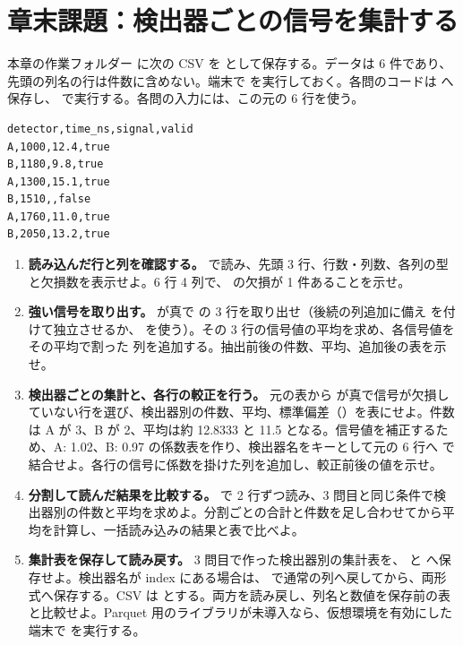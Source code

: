 \section{章末課題：検出器ごとの信号を集計する}

本章の作業フォルダー  に次の CSV を  として保存する。データは 6 件であり、先頭の列名の行は件数に含めない。端末で  を実行しておく。各問のコードは  へ保存し、 で実行する。各問の入力には、この元の 6 行を使う。

\begin{lstlisting}[numbers=none, xleftmargin=2\zw, title={events.csv}]
detector,time_ns,signal,valid
A,1000,12.4,true
B,1180,9.8,true
A,1300,15.1,true
B,1510,,false
A,1760,11.0,true
B,2050,13.2,true
\end{lstlisting}

\begin{enumerate}
\item \textbf{読み込んだ行と列を確認する。}
 で読み、先頭 3 行、行数・列数、各列の型と欠損数を表示せよ。6 行 4 列で、 の欠損が 1 件あることを示せ。

\item \textbf{強い信号を取り出す。}
 が真で  の 3 行を取り出せ（後続の列追加に備え  を付けて独立させるか、 を使う）。その 3 行の信号値の平均を求め、各信号値をその平均で割った  列を追加する。抽出前後の件数、平均、追加後の表を示せ。

\item \textbf{検出器ごとの集計と、各行の較正を行う。}
元の表から  が真で信号が欠損していない行を選び、検出器別の件数、平均、標準偏差（）を表にせよ。件数は A が 3、B が 2、平均は約 12.8333 と 11.5 となる。信号値を補正するため、A: 1.02、B: 0.97 の係数表を作り、検出器名をキーとして元の 6 行へ  で結合せよ。各行の信号に係数を掛けた列を追加し、較正前後の値を示せ。

\item \textbf{分割して読んだ結果を比較する。}
 で 2 行ずつ読み、3 問目と同じ条件で検出器別の件数と平均を求めよ。分割ごとの合計と件数を足し合わせてから平均を計算し、一括読み込みの結果と表で比べよ。

\item \textbf{集計表を保存して読み戻す。}
3 問目で作った検出器別の集計表を、 と  へ保存せよ。検出器名が index にある場合は、 で通常の列へ戻してから、両形式へ保存する。CSV は  とする。両方を読み戻し、列名と数値を保存前の表と比較せよ。Parquet 用のライブラリが未導入なら、仮想環境を有効にした端末で  を実行する。

\end{enumerate}
